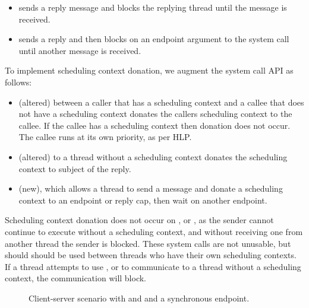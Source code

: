 \begin{itemize}
	\item \reply sends a reply message and blocks the replying thread until the message is received.
	\item \replywait sends a reply and then blocks on an endpoint argument to the system call until another message is received.
\end{itemize}

To implement scheduling context donation, we augment the system call API as follows:

\begin{itemize}
	\item \call (altered) between a caller that has a scheduling context and a callee that does not have a scheduling context donates the callers scheduling context to the callee. If the callee has a scheduling context then donation does not occur. The callee runs at its own priority, as per \gls{HLP}.
	\item \replywait (altered) to a thread without a scheduling context donates the scheduling context to subject of the reply.
    \item \sendwait (new), which allows a thread to send a message and donate a scheduling context to an endpoint or reply cap, then wait on another endpoint.
\end{itemize}

Scheduling context donation does not occur on \send, \nbsend or \reply,  as the sender cannot continue to execute without a scheduling context, and without receiving one from another thread the sender is blocked.
These system calls are not unusable, but should should be used between threads who have their own scheduling contexts.
If a thread attempts to use \send, \reply or \nbsend to communicate to a thread without a scheduling context, the communication will block.

\begin{figure}
\centering
\caption{Client-server scenario with \call and \replywait and a synchronous endpoint.}
\label{fig:client-server-endpoint}
\end{figure}

